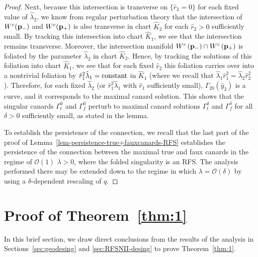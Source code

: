 \documentclass[11pt]{article}
\numberwithin{equation}{section}
\begin{document}
\begin{proof}
Next, because this intersection is transverse on $\{ \hat r_2 = 0 \}$ for each fixed value of $\hat \lambda_2$, we know from regular perturbation theory that the intersection of $W^{c}({\bf p}_-)$ and $W^{c}({\bf p}_+)$ is also transverse in chart $\hat K_2$ for each $\hat r_2>0$ sufficiently small. 
By tracking this intersection into chart $\hat K_1$, we see that the intersection remains transverse.
Moreover, the intersection manifold $W^{c}\left( \bf{p}_- \right) \cap W^{c}\left( \bf{p}_+\right)$ is foliated by the parameter $\mathcal{\hat{\lambda}}_2$ in chart $\hat{K}_2$.
Hence, by tracking the solutions of this foliation into chart $\hat{K}_1$, we see that for each fixed $\hat{r}_2$ 
this foliation carries over into a nontrivial foliation by $\hat{r}_1^2 {\hat{\lambda}}_1 = {\rm constant}$ in $\hat{K}_1$
(where we recall that ${\hat{\lambda}}_1 \hat{r}_1^2 = {\hat{\lambda}}_2 \hat{r}_2^2$).
Therefore, for each fixed $\mathcal{\hat{\lambda}}_2$ (or $\hat{r}_1^2 \mathcal{\hat{\lambda}}_1$ with $\hat{r}_1$ sufficiently small), $\Gamma_{20}(\hat{y}_2)$ is a curve, and it corresponds to the maximal canard solution. 
This shows that the singular canards $\Gamma_{t}^0$ and $\Gamma_{f}^0$ perturb to maximal canard solutions $\Gamma_{t}^{\delta}$ and $\Gamma_{f}^{\delta}$ for all $\delta > 0$ sufficiently small, as stated in the lemma.

To establish the persistence of the connection, we recall that the last part of the proof of Lemma~\ref{lem-persistence-true+fauxcanards-RFS} establishes the persistence of the connection between the maximal true and faux canards in the regime of $\mathcal O(1)$ $\lambda>0$, where the folded singularity is an RFS.
The analysis performed there may be extended down to the regime in which $\lambda=\mathcal{O}(\delta)$ by using a $\delta$-dependent rescaling of $q$.
\end{proof}

\section{Proof of Theorem~\texorpdfstring{\ref{thm:1}}{Lg}}\label{sec:proof-theorem1}

In this brief section, we draw direct conclusions from the results of the analysis in Sections~\ref{sec:geodesing} and \ref{sec:RFSNII-desing} to prove Theorem~\ref{thm:1}. 
\end{document}
